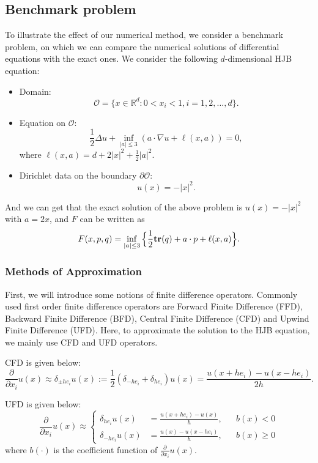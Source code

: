 \documentclass[12pt]{article}
\begin{document}
\subsection{Benchmark problem}

To illustrate the effect of our numerical method, we consider a benchmark problem, on which we can compare the numerical solutions of differential equations with the exact ones. We consider the following $d$-dimensional HJB equation:
\begin{itemize}
    \item Domain:
    $$\mathcal{O} = \{x \in \mathbb{R}^{d} : 0 < x_{i} < 1, i = 1, 2 , \dots, d\}.$$
    \item Equation on $\mathcal{O}$:
    $$\frac{1}{2} \Delta u + \inf_{|a| \leq 3} (a \cdot \nabla u + \ell (x, a)) = 0, $$
    where $\ell (x, a) = d + 2 |x|^{2} + \frac{1}{2} |a|^{2}$.
    \item Dirichlet data on the boundary $\partial \mathcal{O}$:
    $$u(x) = - |x|^{2}.$$
\end{itemize} 
And we can get that the exact solution of the above problem is $u (x) = -|x|^{2}$ with $a = 2x$, and $F$ can be written as
\begin{equation*}
    F(x, p, q) = \inf_{|a| \leq 3} \Big{\{} \frac{1}{2} \textbf{tr} (q) + a \cdot p + \ell (x, a) \Big{\}}.
\end{equation*}

\subsubsection{Methods of Approximation}

First, we will introduce some notions of finite difference operators. Commonly used first order finite difference operators are Forward Finite Difference (FFD), Backward Finite Difference (BFD), Central Finite Difference (CFD) and Upwind Finite Difference (UFD). Here, to approximate the solution to the HJB equation, we mainly use CFD and UFD operators.

CFD is given below:
$$\frac{\partial}{\partial x_i} u(x) \approx \delta_{\pm he_i}u(x) := \frac{1}{2}(\delta_{-he_i} + \delta_{he_i}) u(x) = \frac{u(x+he_i) - u(x-he_i)}{2h}.$$

UFD is given below:
$$ \frac{\partial}{\partial x_i} u(x) \approx \left\{
\begin{aligned}
\delta_{he_i} u(x) & = \frac{u(x+he_i) - u(x)}{h},    &   & {b(x) < 0} \\
\delta_{-he_i} u(x) & = \frac{u(x) - u(x-he_i)}{h},   &   & {b(x) \ge 0}
\end{aligned}
\right.
$$
where $b(\cdot)$ is the coefficient function of $\frac{\partial}{\partial x_i} u(x)$.
\end{document}
